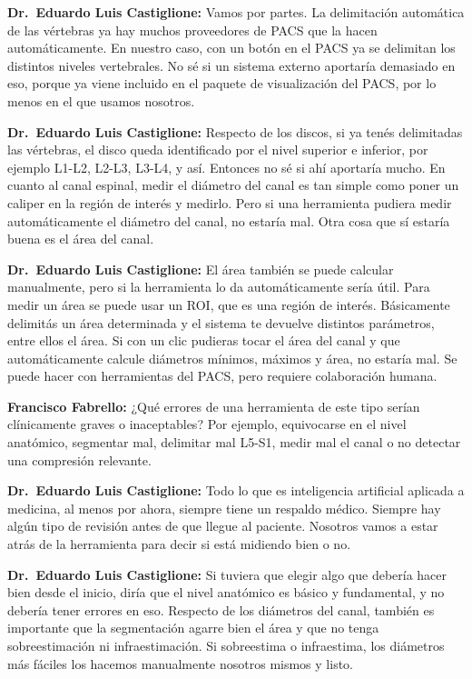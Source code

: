 \noindent\textbf{Dr.~Eduardo Luis Castiglione:} Vamos por partes. La delimitación automática de las vértebras ya hay muchos proveedores de PACS que la hacen automáticamente. En nuestro caso, con un botón en el PACS ya se delimitan los distintos niveles vertebrales. No sé si un sistema externo aportaría demasiado en eso, porque ya viene incluido en el paquete de visualización del PACS, por lo menos en el que usamos nosotros.

\noindent\textbf{Dr.~Eduardo Luis Castiglione:} Respecto de los discos, si ya tenés delimitadas las vértebras, el disco queda identificado por el nivel superior e inferior, por ejemplo L1-L2, L2-L3, L3-L4, y así. Entonces no sé si ahí aportaría mucho. En cuanto al canal espinal, medir el diámetro del canal es tan simple como poner un caliper en la región de interés y medirlo. Pero si una herramienta pudiera medir automáticamente el diámetro del canal, no estaría mal. Otra cosa que sí estaría buena es el área del canal.

\noindent\textbf{Dr.~Eduardo Luis Castiglione:} El área también se puede calcular manualmente, pero si la herramienta lo da automáticamente sería útil. Para medir un área se puede usar un ROI, que es una región de interés. Básicamente delimitás un área determinada y el sistema te devuelve distintos parámetros, entre ellos el área. Si con un clic pudieras tocar el área del canal y que automáticamente calcule diámetros mínimos, máximos y área, no estaría mal. Se puede hacer con herramientas del PACS, pero requiere colaboración humana.

\noindent\textbf{Francisco Fabrello:} ¿Qué errores de una herramienta de este tipo serían clínicamente graves o inaceptables? Por ejemplo, equivocarse en el nivel anatómico, segmentar mal, delimitar mal L5-S1, medir mal el canal o no detectar una compresión relevante.

\noindent\textbf{Dr.~Eduardo Luis Castiglione:} Todo lo que es inteligencia artificial aplicada a medicina, al menos por ahora, siempre tiene un respaldo médico. Siempre hay algún tipo de revisión antes de que llegue al paciente. Nosotros vamos a estar atrás de la herramienta para decir si está midiendo bien o no.

\noindent\textbf{Dr.~Eduardo Luis Castiglione:} Si tuviera que elegir algo que debería hacer bien desde el inicio, diría que el nivel anatómico es básico y fundamental, y no debería tener errores en eso. Respecto de los diámetros del canal, también es importante que la segmentación agarre bien el área y que no tenga sobreestimación ni infraestimación. Si sobreestima o infraestima, los diámetros más fáciles los hacemos manualmente nosotros mismos y listo.

